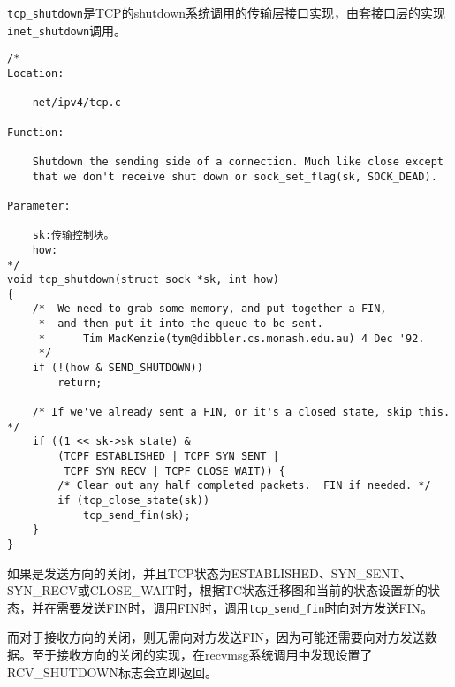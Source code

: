         \texttt{tcp_shutdown}是TCP的shutdown系统调用的传输层接口实现，由套接口层的实现\texttt{inet_shutdown}调用。
\begin{verbatim}
/*
Location:

    net/ipv4/tcp.c

Function:
    
    Shutdown the sending side of a connection. Much like close except
    that we don't receive shut down or sock_set_flag(sk, SOCK_DEAD).

Parameter:

    sk:传输控制块。
    how:
*/
void tcp_shutdown(struct sock *sk, int how)
{
    /*  We need to grab some memory, and put together a FIN,
     *  and then put it into the queue to be sent.
     *      Tim MacKenzie(tym@dibbler.cs.monash.edu.au) 4 Dec '92.
     */
    if (!(how & SEND_SHUTDOWN))
        return;

    /* If we've already sent a FIN, or it's a closed state, skip this. */
    if ((1 << sk->sk_state) &
        (TCPF_ESTABLISHED | TCPF_SYN_SENT |
         TCPF_SYN_RECV | TCPF_CLOSE_WAIT)) {
        /* Clear out any half completed packets.  FIN if needed. */
        if (tcp_close_state(sk))
            tcp_send_fin(sk);
    }
}
\end{verbatim}
        如果是发送方向的关闭，并且TCP状态为ESTABLISHED、SYN\_SENT、SYN\_RECV或CLOSE\_WAIT时，根据TC状态迁移图和当前的状态设置新的状态，并在需要发送FIN时，调用FIN时，调用\texttt{tcp_send_fin}时向对方发送FIN。

        而对于接收方向的关闭，则无需向对方发送FIN，因为可能还需要向对方发送数据。至于接收方向的关闭的实现，在recvmsg系统调用中发现设置了RCV\_SHUTDOWN标志会立即返回。



